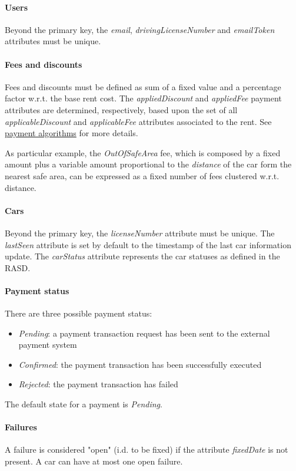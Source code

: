 \paragraph{Users} Beyond the primary key, the \mbox{\emph{email}}, \mbox{\emph{drivingLicenseNumber}} and \mbox{\emph{emailToken}} attributes must be unique.

\paragraph{Fees and discounts}
Fees and discounts must be defined as sum of a fixed value and a percentage factor w.r.t. the base rent cost.
The \emph{appliedDiscount} and \emph{appliedFee} payment attributes are determined, respectively, based upon the set of all \emph{applicableDiscount} and \emph{applicableFee} attributes associated to the rent. See \hyperref[sec:paymentAlgorithms]{payment algorithms} for more details.

As particular example, the \emph{OutOfSafeArea} fee, which is composed by a fixed amount plus a variable amount proportional to the \emph{distance} of the car form the nearest safe area, can be expressed as a fixed number of fees clustered w.r.t. distance.

\paragraph{Cars}Beyond the primary key, the \mbox{\emph{licenseNumber}} attribute must be unique. The \mbox{\emph{lastSeen}} attribute is set by default to the timestamp of the last car information update. The \mbox{\emph{carStatus}} attribute represents the car statuses as defined in the RASD.

\paragraph{Payment status} There are three possible payment status:
\begin{itemize}
	\item \emph{Pending}: a payment transaction request has been sent to the external payment system
	\item \emph{Confirmed}: the payment transaction has been successfully executed
	\item \emph{Rejected}: the payment transaction has failed
\end{itemize}
The default state for a payment is \emph{Pending}.

\paragraph{Failures}A failure is considered "open" (i.d. to be fixed) if the attribute \emph{fixedDate} is not present. A car can have at most one open failure.

